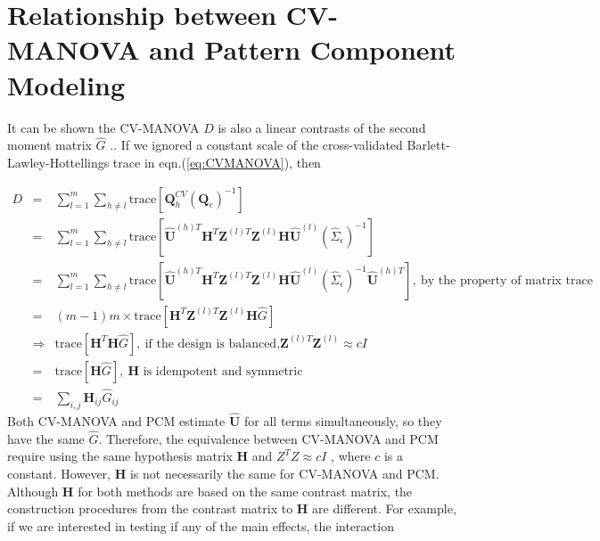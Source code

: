 \documentclass[english]{article}\usepackage[]{graphicx}\usepackage[]{color}
\begin{document}
\section{Relationship between CV-MANOVA and Pattern Component Modeling}

It can be shown the CV-MANOVA $D$ is also a linear contrasts of the
second moment matrix $\hat{G}$ \cite{waltherrepresentational}..
If we ignored a constant scale of the cross-validated Barlett-Lawley-Hottellings
trace in eqn.(\ref{eq:CVMANOVA}), then

\begin{eqnarray*}
D & = & \sum_{l=1}^{m}\sum_{h\neq l}\text{trace}\left[\boldsymbol{Q}_{h}^{CV}\left(\boldsymbol{Q}_{e}\right)^{-1}\right]\\
 & = & \sum_{l=1}^{m}\sum_{h\neq l}\text{trace}\left[\hat{\boldsymbol{U}}^{(h)T}\boldsymbol{H}^{T}\boldsymbol{Z}^{(l)T}\boldsymbol{Z}^{(l)}\boldsymbol{H}\hat{\boldsymbol{U}}^{(l)}\left(\hat{\Sigma}_{\epsilon}\right)^{-1}\right]\\
 & = & \sum_{l=1}^{m}\sum_{h\neq l}\text{trace}\left[\hat{\boldsymbol{U}}^{(h)T}\boldsymbol{H}^{T}\boldsymbol{Z}^{(l)T}\boldsymbol{Z}^{(l)}\boldsymbol{H}\hat{\boldsymbol{U}}^{(l)}\left(\hat{\Sigma}_{\epsilon}\right)^{-1}\hat{\boldsymbol{U}}^{(h)T}\right],\ \text{by the property of matrix trace}\\
 & = & (m-1)m\times\text{trace}\left[\boldsymbol{H}^{T}\boldsymbol{Z}^{(l)T}\boldsymbol{Z}^{(l)}\boldsymbol{H}\hat{G}\right]\\
 & \Rightarrow & \text{trace}\left[\boldsymbol{H}^{T}\boldsymbol{H}\hat{G}\right],\ \text{if the design is balanced,}\boldsymbol{Z}^{(l)T}\boldsymbol{Z}^{(l)}\approx cI\\
 & = & \text{trace}\left[\boldsymbol{H}\hat{G}\right],\ \boldsymbol{H}\text{ is idempotent and symmetric}\\
 & = & \sum_{i,j}\boldsymbol{H}_{ij}\hat{G}_{ij}
\end{eqnarray*}
Both CV-MANOVA and PCM estimate $\hat{\boldsymbol{U}}$ for all terms
simultaneously, so they have the same $\hat{G}$. Therefore, the equivalence
between CV-MANOVA and PCM require using the same hypothesis matrix
$\boldsymbol{H}$ and $Z^{T}Z\approx cI$ , where $c$ is a constant.
However, $\boldsymbol{H}$ is not necessarily the same for CV-MANOVA
and PCM. Although $\boldsymbol{H}$ for both methods are based on
the same contrast matrix, the construction procedures from the contrast
matrix to $\boldsymbol{H}$ are different. For example, if we are
interested in testing if any of the main effects, the interaction
\end{document}
